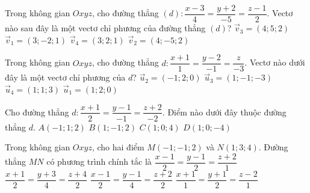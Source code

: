 \begin{vd}[TN2025-0101]%
    Trong không gian $Oxyz$, cho đường thẳng $(d)\colon \dfrac{x-3}{4}=\dfrac{y+2}{-5}=\dfrac{z-1}{2}$. Vectơ nào sau đây là một vectơ chỉ phương của đường thẳng $(d)$?
    \choice
    {$\overrightarrow{v}_3=(4; 5; 2)$}
    {$\overrightarrow{v}_1=(3;-2; 1)$}
    {$\overrightarrow{v}_4=(3; 2; 1)$}
    {\True $\overrightarrow{v}_2=(4;-5; 2)$}
\end{vd}
\begin{vd}[TN2024-102]%
    Trong không gian $Oxyz$, cho đường thẳng $d\colon \dfrac{x+1}{1} =\dfrac{y-2}{-1} =\dfrac{z}{-3}$. Vectơ nào dưới đây là một vectơ chỉ phương của $d$?
    \choice
    {$\overrightarrow{u}_2=(-1; 2; 0)$}
    {\True $\overrightarrow{u}_3=(1;-1; -3)$}
    {$\overrightarrow{u}_4=(1; 1; 3)$}
    {$\overrightarrow{u}_1=(1; 2; 0)$}
\end{vd}
\begin{vd}%
    Cho đường thẳng $d\colon \dfrac{x+1}{2}=\dfrac{y-1}{-1}=\dfrac{z+2}{-2}$. Điểm nào dưới đây thuộc đường thẳng $d$.
    \choice
    {$A(-1;1;2)$}
    {$B(1;-1;2)$}
    {$C(1;0;4)$}
    {\True $D(1;0;-4)$}
\end{vd}
\begin{vd}%
    Trong không gian $Oxyz$, cho hai điểm $M(-1;-1;2)$ và $N(1;3;4)$. Đường thẳng $MN$ có phương trình chính tắc là
    \choice
    {$\dfrac{x-1}{2}=\dfrac{y-1}{2}=\dfrac{z+2}{1}$}
    {$\dfrac{x+1}{2}=\dfrac{y+3}{4}=\dfrac{z+4}{2}$}
    {$\dfrac{x-1}{2}=\dfrac{y-1}{4}=\dfrac{z+2}{2}$}
    {\True $\dfrac{x+1}{1}=\dfrac{y+1}{2}=\dfrac{z-2}{1}$}
\end{vd}
